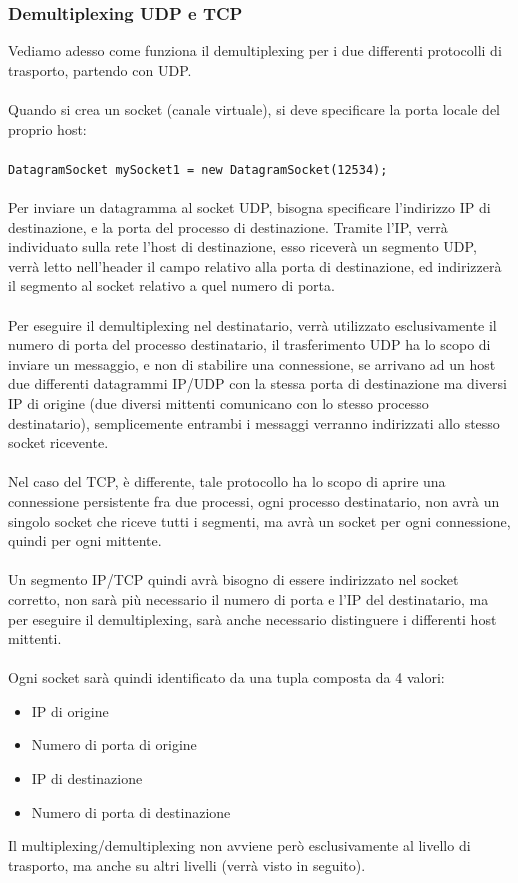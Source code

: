 \documentclass[12pt, letterpaper]{article}
\newcommand{\code}[1]{\colorbox{light-gray}{\texttt{#1}}}
\newcommand{\acc}{\\\hphantom{}\\}
\begin{document}
\subsubsection{Demultiplexing UDP e TCP}
Vediamo adesso come funziona il demultiplexing per i due differenti protocolli di trasporto, partendo con
UDP.\acc
Quando si crea un socket (canale virtuale), si deve specificare la porta locale del proprio host:\acc
\code{DatagramSocket mySocket1 = new DatagramSocket(12534);}
\acc
Per inviare un datagramma al socket UDP, bisogna specificare l'indirizzo IP di destinazione, e la porta del
processo di destinazione. Tramite l'IP, verrà individuato sulla rete l'host di destinazione, esso riceverà un
segmento UDP, verrà letto nell'header il campo relativo alla porta di destinazione, ed indirizzerà il
segmento al socket relativo a quel numero di porta.\acc
Per eseguire il demultiplexing nel destinatario, verrà utilizzato esclusivamente il numero di porta
del processo destinatario, il trasferimento UDP ha lo scopo di inviare un messaggio, e non di stabilire una
connessione, se arrivano ad un host due differenti datagrammi IP/UDP con la stessa porta di destinazione ma
diversi IP di origine (due diversi mittenti comunicano con lo stesso processo destinatario), semplicemente
entrambi i messaggi verranno indirizzati allo stesso socket ricevente.\acc
Nel caso del TCP, è differente, tale protocollo ha lo scopo di aprire una connessione persistente fra due
processi, ogni processo destinatario, non avrà un singolo socket che riceve tutti i segmenti, ma avrà
un socket per ogni connessione, quindi per ogni mittente.\acc
Un segmento IP/TCP quindi avrà bisogno di essere indirizzato nel socket corretto, non sarà più necessario
il numero di porta e l'IP del destinatario, ma per eseguire il demultiplexing, sarà anche necessario
distinguere i differenti host mittenti. \acc
Ogni socket sarà quindi identificato da una tupla composta da 4 valori:\begin{itemize}
    \item IP di origine
    \item Numero di porta di origine
    \item IP di destinazione
    \item Numero di porta di destinazione
\end{itemize}
Il multiplexing/demultiplexing non avviene però esclusivamente al livello di trasporto, ma anche su altri
livelli (verrà visto in seguito).
\end{document}
